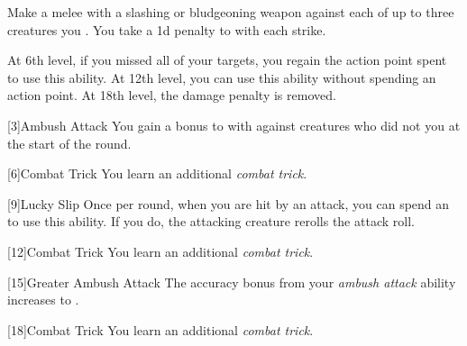 {             Make a melee  with a slashing or bludgeoning weapon against each of up to three creatures you .
            You take a \minus1d penalty to  with each strike.
            \par At 6th level, if you missed all of your targets, you regain the action point spent to use this ability.
            At 12th level, you can use this ability without spending an action point.
            At 18th level, the damage penalty is removed.
        }

        [3]{Ambush Attack}
        You gain a  bonus to  with  against creatures who did not  you at the start of the round.

        [6]{Combat Trick}
        You learn an additional \textit{combat trick}.

        [9]{Lucky Slip}
        Once per round, when you are hit by an attack, you can spend an  to use this ability.
        If you do, the attacking creature rerolls the attack roll.

        [12]{Combat Trick}
        You learn an additional \textit{combat trick}.

        [15]{Greater Ambush Attack}
        The accuracy bonus from your \textit{ambush attack} ability increases to .

        [18]{Combat Trick}
        You learn an additional \textit{combat trick}.
